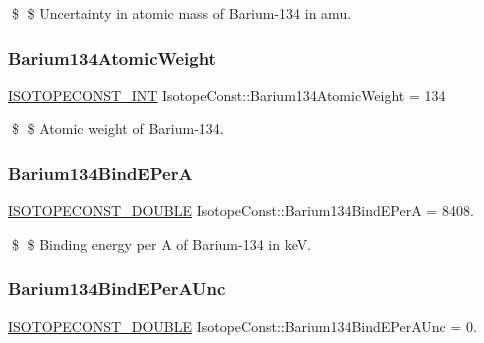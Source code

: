 \$ \$ Uncertainty in atomic mass of Barium-\/134 in amu. \mbox{\label{group___isotope_const-_barium-_ba134_ga73ebb72a373caa2506d7bba815d89e26}} 
\subsubsection{\texorpdfstring{Barium134\+Atomic\+Weight}{Barium134AtomicWeight}}
{\footnotesize\ttfamily \mbox{\hyperlink{group___isotope_const-_macros_ga5f18360b3e99483a35c32d789e62621c}{I\+S\+O\+T\+O\+P\+E\+C\+O\+N\+S\+T\+\_\+\+I\+NT}} Isotope\+Const\+::\+Barium134\+Atomic\+Weight = 134}

\$ \$ Atomic weight of Barium-\/134. \mbox{\label{group___isotope_const-_barium-_ba134_ga983a0daa8d239c30008eee7d87b05ee5}} 
\subsubsection{\texorpdfstring{Barium134\+Bind\+E\+PerA}{Barium134BindEPerA}}
{\footnotesize\ttfamily \mbox{\hyperlink{group___isotope_const-_macros_ga8f45a7272ce02c0b4c65c44636ed719a}{I\+S\+O\+T\+O\+P\+E\+C\+O\+N\+S\+T\+\_\+\+D\+O\+U\+B\+LE}} Isotope\+Const\+::\+Barium134\+Bind\+E\+PerA = 8408.}

\$ \$ Binding energy per A of Barium-\/134 in keV. \mbox{\label{group___isotope_const-_barium-_ba134_ga0b8dda1161eba54e3417ce2523003c88}} 
\subsubsection{\texorpdfstring{Barium134\+Bind\+E\+Per\+A\+Unc}{Barium134BindEPerAUnc}}
{\footnotesize\ttfamily \mbox{\hyperlink{group___isotope_const-_macros_ga8f45a7272ce02c0b4c65c44636ed719a}{I\+S\+O\+T\+O\+P\+E\+C\+O\+N\+S\+T\+\_\+\+D\+O\+U\+B\+LE}} Isotope\+Const\+::\+Barium134\+Bind\+E\+Per\+A\+Unc = 0.}

